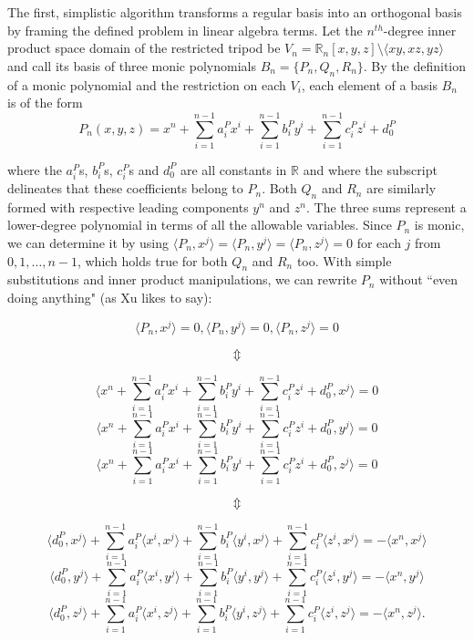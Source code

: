\documentclass[letterpaper, 12pt]{article}
\begin{document}
The first, simplistic algorithm transforms a regular basis into an orthogonal basis by framing the defined problem in linear algebra terms. Let the $n^{th}$-degree inner product space domain of the restricted tripod be $V_n = \mathbb{R}_n [x, y, z] \setminus \langle xy, xz, yz\rangle$ and call its basis of three monic polynomials $B_n = \{P_n, Q_n, R_n\}$. By the definition of a monic polynomial and the restriction on each $V_i$, each element of a basis $B_n$ is of the form
$$P_n(x,y,z) = x^n + \sum_{i=1}^{n-1}a_i^Px^i + \sum_{i=1}^{n-1}b_i^Py^i + \sum_{i=1}^{n-1}c_i^Pz^i + d_0^P$$

\noindent where the $a_i^P$s, $b_i^P$s, $c_i^P$s and $d_0^P$ are all constants in $\mathbb{R}$ and where the subscript delineates that these coefficients belong to $P_n$. Both $Q_n$ and $R_n$ are similarly formed with respective leading components $y^n$ and $z^n$. The three sums represent a lower-degree polynomial in terms of all the allowable variables. Since $P_n$ is monic, we can determine it by using $\langle P_n, x^j\rangle = \langle P_n,y^j\rangle = \langle P_n, z^j\rangle = 0$ for each $j$ from $0, 1, \ldots, n-1$, which holds true for both $Q_n$ and $R_n$ too. With simple substitutions and inner product manipulations, we can rewrite $P_n$ without ``even doing anything" (as Xu likes to say):

\singlespacing
\vspace{-2mm}
$$\langle P_n, x^j\rangle = 0, \langle P_n, y^j\rangle = 0, \langle P_n, z^j\rangle = 0$$

\vspace{-4mm}
$$\Updownarrow$$

\vspace{-4mm}
$$\langle x^n + \sum_{i=1}^{n-1} a_i^Px^i + \sum_{i=1}^{n-1} b_i^Py^i + \sum_{i=1}^{n-1} c_i^Pz^i + d_0^P, x^j\rangle = 0$$
$$\langle x^n + \sum_{i=1}^{n-1} a_i^Px^i + \sum_{i=1}^{n-1} b_i^Py^i + \sum_{i=1}^{n-1} c_i^Pz^i + d_0^P, y^j\rangle = 0$$
$$\langle x^n + \sum_{i=1}^{n-1} a_i^Px^i + \sum_{i=1}^{n-1} b_i^Py^i + \sum_{i=1}^{n-1} c_i^Pz^i + d_0^P, z^j\rangle = 0$$

\vspace{-2mm}
$$\Updownarrow$$

\vspace{-4mm}
$$\langle d_0^P, x^j\rangle + \sum_{i=1}^{n-1} a_i^P\langle x^i, x^j\rangle + \sum_{i=1}^{n-1} b_i^P\langle y^i, x^j\rangle + \sum_{i=1}^{n-1} c_i^P\langle z^i, x^j\rangle = -\langle x^n, x^j\rangle$$
$$\langle d_0^P, y^j\rangle + \sum_{i=1}^{n-1} a_i^P\langle x^i, y^j\rangle + \sum_{i=1}^{n-1} b_i^P\langle y^i, y^j\rangle + \sum_{i=1}^{n-1} c_i^P\langle z^i, y^j\rangle = -\langle x^n, y^j\rangle$$
$$\langle d_0^P, z^j\rangle + \sum_{i=1}^{n-1} a_i^P\langle x^i, z^j\rangle + \sum_{i=1}^{n-1} b_i^P\langle y^i, z^j\rangle + \sum_{i=1}^{n-1} c_i^P\langle z^i, z^j\rangle = -\langle x^n, z^j\rangle.$$
\end{document}
